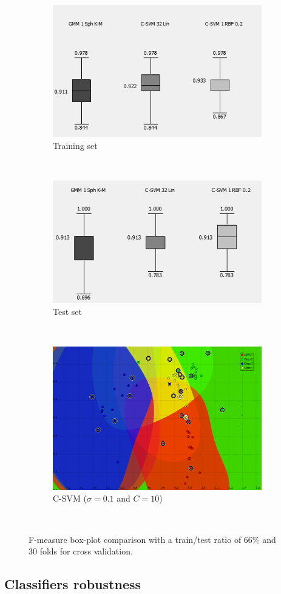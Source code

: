\documentclass[a4paper,10pt]{article}
\begin{document}
\begin{figure}[H]
\centering
	\begin{subfigure}[t]{0.3\textwidth} \label{fig:best-GMM}
      \centering
      \includegraphics[height=3.2 cm]{pictures/Compare-best-classification-training}
      \caption{Training set}
      \label{fig:Compare-best-classification-training}
    \end{subfigure}%
    ~
    \begin{subfigure}[t]{0.3\textwidth} \label{fig:best-SVM}
      \centering
      \includegraphics[height=3.2 cm]{pictures/Compare-best-classification-test}
      \caption{Test set}
      \label{fig:Compare-best-classification-training}
     \end{subfigure}
      ~
    \begin{subfigure}[t]{0.3\textwidth} \label{fig:best-C-SVM}
      \centering
      \includegraphics[height= 3.2 cm]{pictures/classification-best.png}
      \caption{C-SVM ($\sigma = 0.1$ and $C=10$)}
      \label{fig:classification-best}
     \end{subfigure}
      ~
     \caption{F-measure box-plot comparison with a train/test ratio of 66\% and 30 folds for cross validation.}
\end{figure}


\subsection{Classifiers robustness} \label{fig:classifier_robustness}
\end{document}

